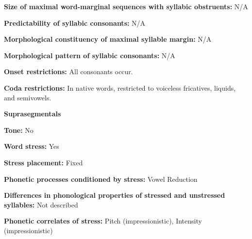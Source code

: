 \begin{styleBody}
\textbf{Size of maximal word{}-marginal sequences with syllabic obstruents:} N/A
\end{styleBody}

\begin{styleBody}
\textbf{Predictability of syllabic consonants:} N/A
\end{styleBody}

\begin{styleBody}
\textbf{Morphological constituency of maximal syllable margin:} N/A
\end{styleBody}

\begin{styleBody}
\textbf{Morphological pattern of syllabic consonants:} N/A
\end{styleBody}

\begin{styleBody}
\textbf{Onset restrictions:} All consonants occur.
\end{styleBody}

\begin{styleBody}
\textbf{Coda restrictions: }In native words, restricted to voiceless fricatives, liquids, and semivowels.
\end{styleBody}

\begin{styleBody}
\textbf{Suprasegmentals}
\end{styleBody}

\begin{styleBody}
\textbf{Tone:} No
\end{styleBody}

\begin{styleBody}
\textbf{Word stress:} Yes
\end{styleBody}

\begin{styleBody}
\textbf{Stress placement:} Fixed
\end{styleBody}

\begin{styleBody}
\textbf{Phonetic processes conditioned by stress:} Vowel Reduction
\end{styleBody}

\begin{styleBody}
\textbf{Differences in phonological properties of stressed and unstressed syllables:} Not described
\end{styleBody}

\begin{styleBody}
\textbf{Phonetic correlates of stress: }Pitch (impressionistic), Intensity (impressionistic)
\end{styleBody}

